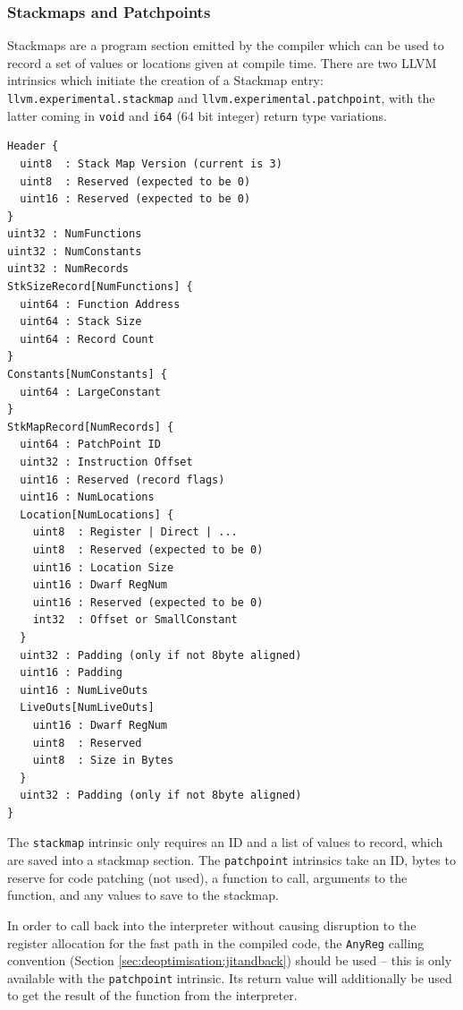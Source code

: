 \documentclass[journal,comsoc]{IEEEtran}
\begin{document}
	\subsubsection{Stackmaps and Patchpoints}
		Stackmaps are a program section emitted by the compiler which can be used to record a set of values or locations given at compile time. There are two LLVM intrinsics which initiate the creation of a Stackmap entry: \lstinline|llvm.experimental.stackmap| and \lstinline|llvm.experimental.patchpoint|, with the latter coming in \lstinline|void| and \lstinline|i64| (64 bit integer) return type variations.
		
\begin{lstlisting}[caption={Stackmap Section Layout}, label={lst:stackmap}, basicstyle=\footnotesize]
Header {
  uint8  : Stack Map Version (current is 3)
  uint8  : Reserved (expected to be 0)
  uint16 : Reserved (expected to be 0)
}
uint32 : NumFunctions
uint32 : NumConstants
uint32 : NumRecords
StkSizeRecord[NumFunctions] {
  uint64 : Function Address
  uint64 : Stack Size
  uint64 : Record Count
}
Constants[NumConstants] {
  uint64 : LargeConstant
}
StkMapRecord[NumRecords] {
  uint64 : PatchPoint ID
  uint32 : Instruction Offset
  uint16 : Reserved (record flags)
  uint16 : NumLocations
  Location[NumLocations] {
    uint8  : Register | Direct | ...
    uint8  : Reserved (expected to be 0)
    uint16 : Location Size
    uint16 : Dwarf RegNum
    uint16 : Reserved (expected to be 0)
    int32  : Offset or SmallConstant
  }
  uint32 : Padding (only if not 8byte aligned)
  uint16 : Padding
  uint16 : NumLiveOuts
  LiveOuts[NumLiveOuts]
    uint16 : Dwarf RegNum
    uint8  : Reserved
    uint8  : Size in Bytes
  }
  uint32 : Padding (only if not 8byte aligned)
}
		\end{lstlisting}
		
		The \lstinline|stackmap| intrinsic only requires an ID and a list of values to record, which are saved into a stackmap section. The \lstinline|patchpoint| intrinsics take an ID, bytes to reserve for code patching (not used), a function to call, arguments to the function, and any values to save to the stackmap.
		
		In order to call back into the interpreter without causing disruption to the register allocation for the fast path in the compiled code, the \lstinline|AnyReg| calling convention (Section \ref{sec:deoptimisation:jitandback}) should be used -- this is only available with the \lstinline|patchpoint| intrinsic. Its return value will additionally be used to get the result of the function from the interpreter.
		
\end{document}
